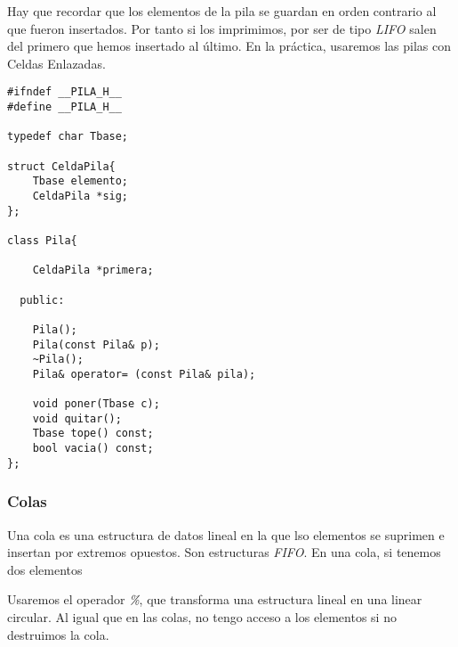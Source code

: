 \documentclass[11pt]{article}
\begin{document}
Hay que recordar que los elementos de la pila se guardan en orden contrario al que fueron insertados. Por tanto si los imprimimos, por ser de tipo \emph{LIFO} salen del 
primero que hemos insertado al último.
En la práctica, usaremos las pilas con Celdas Enlazadas.


\begin{verbatim}
#ifndef __PILA_H__
#define __PILA_H__

typedef char Tbase;

struct CeldaPila{
    Tbase elemento;
    CeldaPila *sig;
};

class Pila{

    CeldaPila *primera;

  public:

    Pila();
    Pila(const Pila& p);
    ~Pila();
    Pila& operator= (const Pila& pila);

    void poner(Tbase c);
    void quitar();
    Tbase tope() const;
    bool vacia() const;
};
\end{verbatim}

\subsubsection{Colas}
\label{sec-1-1-5}

Una cola es una estructura de datos lineal en la que lso elementos se suprimen e insertan por extremos opuestos. Son estructuras \emph{FIFO}. 
En una cola, si tenemos dos elementos

Usaremos el operador \emph{\%}, que transforma una estructura lineal en una linear circular.
Al igual que en las colas, no tengo acceso a los elementos si no destruimos la cola.
\end{document}
